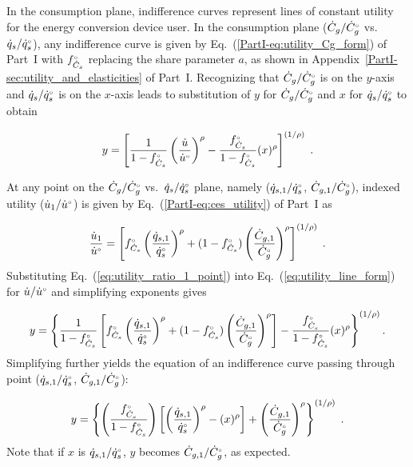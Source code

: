 In the consumption plane,
indifference curves represent lines of constant utility
for the energy conversion device user.
In the consumption plane
($\dot{C}_g/{}{\dot{C}}^{\scriptscriptstyle \circ}_g$ vs.\ $\dot{q}_s/{}{\dot{q}}^{\scriptscriptstyle \circ}_s$), 
any indifference curve 
is given by 
Eq.~(\ref{PartI-eq:utility_Cg_form}) of Part~I
with ${}{f}^{\scriptscriptstyle \circ}_{\dot{C}_s}$ replacing the share parameter $a$, 
as shown in Appendix~\ref{PartI-sec:utility_and_elasticities} of Part~I.
Recognizing that 
$\dot{C}_g/{}{\dot{C}}^{\scriptscriptstyle \circ}_g$ is on the $y$-axis and 
$\dot{q}_s/{}{\dot{q}}^{\scriptscriptstyle \circ}_s$ is on the $x$-axis
leads to substitution of 
$y$ for $\dot{C}_g/{}{\dot{C}}^{\scriptscriptstyle \circ}_g$ and 
$x$ for $\dot{q}_s/{}{\dot{q}}^{\scriptscriptstyle \circ}_s$ to obtain

\begin{equation} \label{eq:utility_line_form}
  y = \left[ \frac{1}{1 - {}{f}^{\scriptscriptstyle \circ}_{\dot{C}_s}} \left( \frac{\dot{u}}{{}{\dot{u}}^{\scriptscriptstyle \circ}} \right)^\rho 
            - \frac{{}{f}^{\scriptscriptstyle \circ}_{\dot{C}_s}}{1 - {}{f}^{\scriptscriptstyle \circ}_{\dot{C}_s}} (x)^\rho \right]^{(1/\rho)} \; .
\end{equation}

At any point on the 
$\dot{C}_g/{}{\dot{C}}^{\scriptscriptstyle \circ}_g$ vs.\ $\dot{q}_s/{}{\dot{q}}^{\scriptscriptstyle \circ}_s$ plane,
namely ($\dot{q}_{s,1}/{}{\dot{q}}^{\scriptscriptstyle \circ}_s$, $\dot{C}_{g,1}/{}{\dot{C}}^{\scriptscriptstyle \circ}_g$),
indexed utility ($\dot{u}_1/{}{\dot{u}}^{\scriptscriptstyle \circ}$) is given by Eq.~(\ref{PartI-eq:ces_utility}) of Part~I as

\begin{equation} \label{eq:utility_ratio_1_point}
  \frac{\dot{u}_1}{{}{\dot{u}}^{\scriptscriptstyle \circ}} =
        \left[ {}{f}^{\scriptscriptstyle \circ}_{\dot{C}_s} \left( \frac{\dot{q}_{s,1}}{{}{\dot{q}}^{\scriptscriptstyle \circ}_s} \right)^\rho
        + (1-{}{f}^{\scriptscriptstyle \circ}_{\dot{C}_s}) \left( \frac{\dot{C}_{g,1}}{{}{\dot{C}}^{\scriptscriptstyle \circ}_g} \right)^\rho  \right]^{(1/\rho)} \; .
\end{equation}
%
Substituting Eq.~(\ref{eq:utility_ratio_1_point}) into Eq.~(\ref{eq:utility_line_form})
for $\dot{u}/{}{\dot{u}}^{\scriptscriptstyle \circ}$
and simplifying exponents gives

\begin{equation}
  y = \left\{ \frac{1}{1 - {}{f}^{\scriptscriptstyle \circ}_{\dot{C}_s}} \left[ {}{f}^{\scriptscriptstyle \circ}_{\dot{C}_s} \left( \frac{\dot{q}_{s,1}}{{}{\dot{q}}^{\scriptscriptstyle \circ}_s} \right)^\rho 
        + (1-{}{f}^{\scriptscriptstyle \circ}_{\dot{C}_s}) \left( \frac{\dot{C}_{g,1}}{{}{\dot{C}}^{\scriptscriptstyle \circ}_g} \right)^\rho   \right] 
            - \frac{{}{f}^{\scriptscriptstyle \circ}_{\dot{C}_s}}{1 - {}{f}^{\scriptscriptstyle \circ}_{\dot{C}_s}} (x)^\rho \right\}^{(1/\rho)}  .
\end{equation}
%
Simplifying further yields
the equation of an indifference curve passing through point 
($\dot{q}_{s,1}/{}{\dot{q}}^{\scriptscriptstyle \circ}_s$, $\dot{C}_{g,1}/{}{\dot{C}}^{\scriptscriptstyle \circ}_g$):

\begin{equation} \label{eq:indiff_curve_eqn}
  y = \left\{ \left( \frac{{}{f}^{\scriptscriptstyle \circ}_{\dot{C}_s}}{1 - {}{f}^{\scriptscriptstyle \circ}_{\dot{C}_s}} \right) \left[ \left( \frac{\dot{q}_{s,1}}{{}{\dot{q}}^{\scriptscriptstyle \circ}_s} \right)^\rho 
                                                          - (x)^\rho  \right]
        + \left( \frac{\dot{C}_{g
        ,1}}{{}{\dot{C}}^{\scriptscriptstyle \circ}_g} \right)^\rho \right\}^{(1/\rho)} \; .
\end{equation}
%
Note that if $x$ is $\dot{q}_{s,1}/{}{\dot{q}}^{\scriptscriptstyle \circ}_s$,
$y$ becomes $\dot{C}_{g,1}/{}{\dot{C}}^{\scriptscriptstyle \circ}_g$,
as expected.
